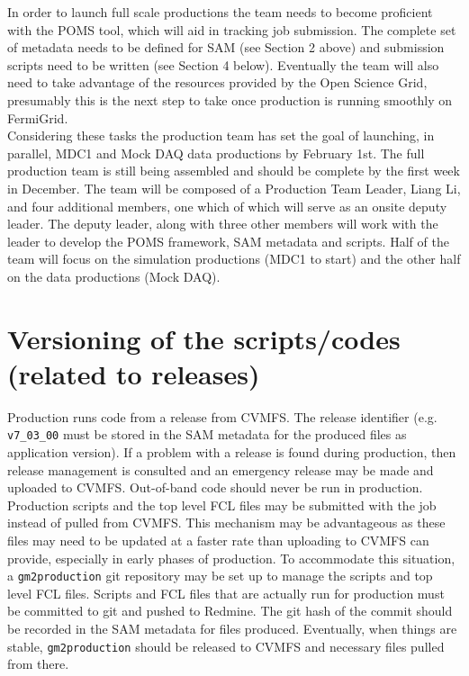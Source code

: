 \noindent In order to launch full scale productions the team needs to become proficient with the POMS tool, which will aid in tracking job submission.  The complete set of metadata needs to be defined for SAM (see Section 2 above) and submission scripts need to be written (see Section 4 below).  Eventually the team will also need to take advantage of the resources provided by the Open Science Grid, presumably this is the next step to take once production is running smoothly on FermiGrid.\\

\noindent Considering these tasks   the production team has set the goal of launching, in parallel, MDC1 and Mock DAQ data productions by February 1st.  The full production team is still being assembled and should be complete by the first week in December. The team will be composed of a Production Team Leader, Liang Li,  and four additional members, one which of which will serve as an onsite deputy leader.  The deputy leader, along with three other members will work with the leader to develop the POMS framework, SAM metadata and scripts. Half of the team will focus on the simulation productions (MDC1 to start) and the other half on the data productions (Mock DAQ).      

\section{Versioning of the scripts/codes (related to releases)}

\noindent Production runs code from a release from CVMFS. The release identifier (e.g. {\tt v7\_03\_00} must be stored in the SAM metadata for the produced files as application version). If a problem with a release is found during production, then release management is consulted and an emergency release may be made and uploaded to CVMFS. Out-of-band code should never be run in production. \\

\noindent Production scripts and the top level FCL files may be submitted with the job instead of pulled from CVMFS. This mechanism may be advantageous as these files may need to be updated at a faster rate than uploading to CVMFS can provide, especially in early phases of production. To accommodate this situation, a {\tt gm2production} git repository may be set up to manage the scripts and top level FCL files. Scripts and FCL files that are actually run for production must be committed to git and pushed to Redmine. The git hash of the commit should be recorded in the SAM metadata for files produced. Eventually, when things are stable, {\tt gm2production} should be released to CVMFS and necessary files pulled from there. 

